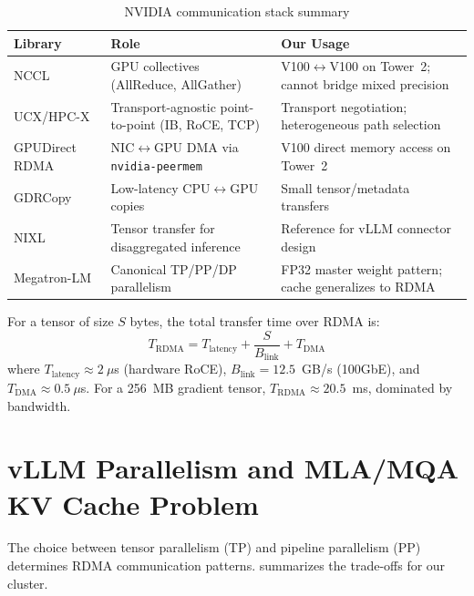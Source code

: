 \documentclass[11pt,letterpaper]{article}
\theoremstyle{definition}
\begin{document}
\begin{table}[htbp]
\centering
\caption{NVIDIA communication stack summary}
\label{tab:nvidia-stack}
\small
\begin{tabular}{@{}lp{4.5cm}p{4.5cm}@{}}
\toprule
\textbf{Library} & \textbf{Role} & \textbf{Our Usage} \\
\midrule
NCCL~\cite{nccl} & GPU collectives (AllReduce, AllGather) & V100$\leftrightarrow$V100 on Tower~2; cannot bridge mixed precision \\
UCX/HPC-X~\cite{ucx,hpcx} & Transport-agnostic point-to-point (IB, RoCE, TCP) & Transport negotiation; heterogeneous path selection \\
GPUDirect RDMA~\cite{gpudirect-rdma-redhat} & NIC$\leftrightarrow$GPU DMA via \texttt{nvidia-peermem} & V100 direct memory access on Tower~2 \\
GDRCopy~\cite{gdrcopy} & Low-latency CPU$\leftrightarrow$GPU copies & Small tensor/metadata transfers \\
NIXL~\cite{nixl} & Tensor transfer for disaggregated inference & Reference for vLLM connector design \\
Megatron-LM~\cite{megatron2020} & Canonical TP/PP/DP parallelism & FP32 master weight pattern; cache generalizes to RDMA \\
\bottomrule
\end{tabular}
\end{table}

For a tensor of size $S$ bytes, the total transfer time over RDMA is:
\begin{equation}
    T_{\text{RDMA}} = T_{\text{latency}} + \frac{S}{B_{\text{link}}} + T_{\text{DMA}}
\end{equation}
where $T_{\text{latency}} \approx 2~\mu$s (hardware RoCE), $B_{\text{link}} = 12.5$~GB/s (100GbE), and $T_{\text{DMA}} \approx 0.5~\mu$s. For a 256~MB gradient tensor, $T_{\text{RDMA}} \approx 20.5$~ms, dominated by bandwidth.

\section{vLLM Parallelism and MLA/MQA KV Cache Problem}
\label{sec:vllm-parallelism}

The choice between tensor parallelism (TP) and pipeline parallelism (PP) determines RDMA communication patterns.  summarizes the trade-offs for our cluster.
\end{document}
